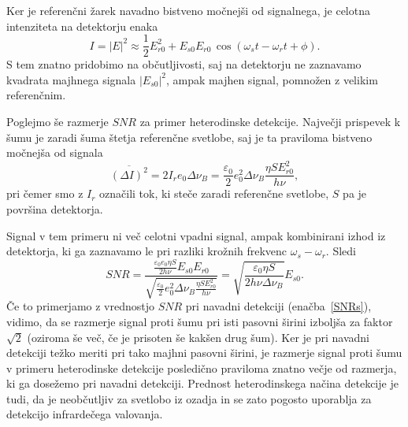 Ker je referenčni žarek navadno bistveno močnejši od signalnega, je celotna intenziteta
na detektorju enaka
\begin{equation}
I = |E|^2 \approx \frac{1}{2}E_{r0}^2 + E_{s0}E_{r0}\,\cos(\omega_st-\omega_rt+\phi).
\end{equation}
S tem znatno pridobimo na občutljivosti, saj na detektorju ne zaznavamo  
kvadrata majhnega signala $|E_{s0}|^2$, ampak majhen signal, pomnožen z velikim referenčnim. 

Poglejmo še razmerje $SNR$ za primer heterodinske detekcije. Največji prispevek k šumu je 
zaradi šuma štetja referenčne svetlobe, saj je ta praviloma bistveno močnejša od signala
\begin{equation}
\overline{(\Delta I)^2} = 2I_re_0 \Delta\nu_B= \frac{\varepsilon_0}{2} 
e_0^2\Delta\nu_B\frac{\eta S E_{r0}^2}{h\nu},
\end{equation}
pri čemer smo z $I_r$ označili tok, ki steče zaradi referenčne svetlobe, $S$ pa je 
površina detektorja. 

Signal v tem primeru ni več celotni vpadni signal, ampak kombinirani izhod iz 
detektorja, ki ga zaznavamo le pri razliki krožnih frekvenc $\omega_s-\omega_r$. Sledi
\begin{equation}
SNR = \frac{\frac{\varepsilon_0 e_0 \eta S}{2h \nu} E_{s0}E_{r0}}{\sqrt{\frac{\varepsilon_0}{2}
e_0^2\Delta\nu_B\frac{\eta S E_{r0}^2}{h\nu}}} = 
\sqrt{\frac{\varepsilon_0\eta S}{2 h \nu \Delta\nu_B}}E_{s0}.
\end{equation}
Če to primerjamo z vrednostjo $SNR$ pri navadni detekciji (enačba~\ref{SNRs}), vidimo, 
da se razmerje signal proti šumu pri isti pasovni širini izboljša za faktor $\sqrt{2}$
(oziroma še več, če je prisoten še kakšen drug šum).
Ker je pri navadni detekciji težko meriti pri tako majhni pasovni širini, je razmerje
signal proti šumu v primeru heterodinske detekcije posledično praviloma znatno večje
od razmerja, ki ga dosežemo pri navadni detekciji. Prednost heterodinskega 
načina detekcije je tudi, da je neobčutljiv za svetlobo iz ozadja in se 
zato pogosto uporablja za detekcijo infrardečega valovanja.
